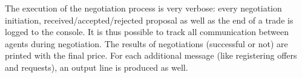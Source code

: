 \documentclass[a4paper,11pt]{article}
\begin{document}
The execution of the negotiation process is very verbose: every negotiation initiation, received/accepted/rejected proposal as well as the end of a trade is logged to the console. It is thus possible to track all communication between agents during negotiation. The results of negotiations (successful or not) are printed with the final price. For each additional message (like registering offers and requests), an output line is produced as well.
\end{document}
